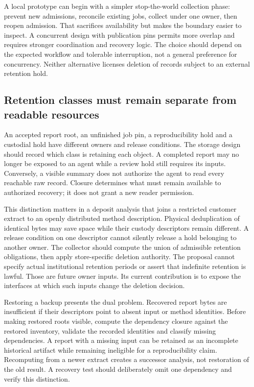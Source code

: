 A local prototype can begin with a simpler stop-the-world collection phase: prevent new admissions, reconcile existing jobs, collect under one owner, then reopen admission. That sacrifices availability but makes the boundary easier to inspect. A concurrent design with publication pins permits more overlap and requires stronger coordination and recovery logic. The choice should depend on the expected workflow and tolerable interruption, not a general preference for concurrency. Neither alternative licenses deletion of records subject to an external retention hold.

\subsection{Retention classes must remain separate from readable resources}
An accepted report root, an unfinished job pin, a reproducibility hold and a custodial hold have different owners and release conditions. The storage design should record which class is retaining each object. A completed report may no longer be exposed to an agent while a review hold still requires its inputs. Conversely, a visible summary does not authorize the agent to read every reachable raw record. Closure determines what must remain available to authorized recovery; it does not grant a new reader permission.

This distinction matters in a deposit analysis that joins a restricted customer extract to an openly distributed method description. Physical deduplication of identical bytes may save space while their custody descriptors remain different. A release condition on one descriptor cannot silently release a hold belonging to another owner. The collector should compute the union of admissible retention obligations, then apply store-specific deletion authority. The proposal cannot specify actual institutional retention periods or assert that indefinite retention is lawful. Those are future owner inputs. Its current contribution is to expose the interfaces at which such inputs change the deletion decision.

Restoring a backup presents the dual problem. Recovered report bytes are insufficient if their descriptors point to absent input or method identities. Before making restored roots visible, compute the dependency closure against the restored inventory, validate the recorded identities and classify missing dependencies. A report with a missing input can be retained as an incomplete historical artifact while remaining ineligible for a reproducibility claim. Recomputing from a newer extract creates a successor analysis, not restoration of the old result. A recovery test should deliberately omit one dependency and verify this distinction.


